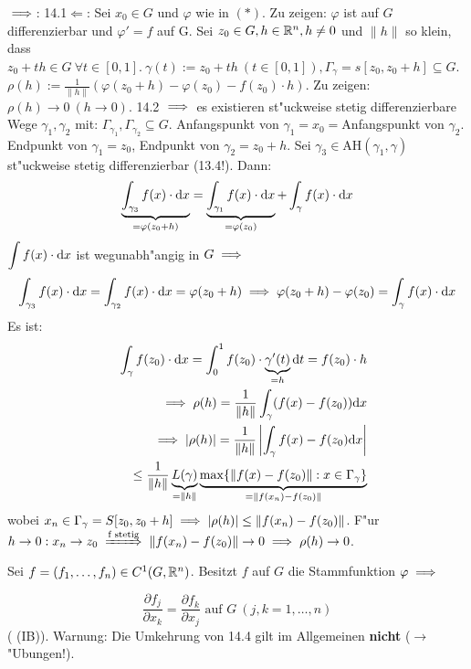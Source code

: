 \documentclass[a4paper,twoside,DIV15,BCOR12mm,chapterprefix=true,headings=twolinechapter]{scrbook}
\begin{document}
\begin{beweis}
\glqq$\implies$\grqq: 14.1\quad \glqq$\Leftarrow$\grqq: Sei $x_0\in G$ und $\varphi$ wie in $(*)$. Zu zeigen: $\varphi$ ist auf $G$ differenzierbar und $\varphi'=f$ auf G. Sei $z_0\in G, h\in\mathbb{R}^n,h\ne 0$ und $\|h\|$ so klein, dass $z_0+th\in G\ \forall t\in[0,1].\ \gamma(t):=z_0+th\ (t\in[0,1]), \Gamma_\gamma=s[z_0, z_0+h]\subseteq G$. $\rho(h):=\frac{1}{\|h\|}(\varphi(z_0+h)-\varphi(z_0)-f(z_0)\cdot h)$. Zu zeigen: $\rho(h)\to 0\ (h\to 0)$. 14.2 $\implies$ es existieren st"uckweise stetig differenzierbare Wege $\gamma_1, \gamma_2$ mit: $\Gamma_{\gamma_1},\Gamma_{\gamma_2}\subseteq G$. Anfangspunkt von $\gamma_1=x_0=$Anfangspunkt von $\gamma_2$. Endpunkt von $\gamma_1=z_0$, Endpunkt von $\gamma_2=z_0+h$. Sei $\gamma_3\in \text{AH}(\gamma_1,\gamma)$ st"uckweise stetig differenzierbar (13.4!). Dann: 
$$\underbrace{\displaystyle\int_{\gamma_3}f(x)\cdot\text{d}x}_{=\varphi(z_0+h)}=\underbrace{\displaystyle\int_{\gamma_1}f(x)\cdot\text{d}x}_{=\varphi(z_0)}+\displaystyle\int_{\gamma}f(x)\cdot\text{d}x$$
$\displaystyle\int f(x)\cdot\text{d}x$ ist wegunabh"angig in $G\implies$\\
$$\displaystyle\int_{\gamma_3}f(x)\cdot\text{d}x=\displaystyle\int_{\gamma_2}f(x)\cdot\text{d}x=\varphi(z_0+h)\implies\varphi(z_0+h)-\varphi(z_0)=\displaystyle\int_{\gamma}f(x)\cdot\text{d}x$$
Es ist:
\begin{eqnarray*}
&&\displaystyle\int_{\gamma}f(z_0)\cdot\text{d}x=\displaystyle\int_0^1 f(z_0)\cdot\underbrace{\gamma'(t)}_{=h}\text{d}t=f(z_0)\cdot h\\
&&\implies \rho(h)=\frac{1}{\|h\|}\displaystyle\int_{\gamma}(f(x)-f(z_0))\text{d}x\\
&&\implies |\rho(h)|=\frac{1}{\|h\|}\left|\displaystyle\int_{\gamma}f(x)-f(z_0)\text{d}x\right|\\
&&\le\frac{1}{\|h\|}\underbrace{L(\gamma)}_{=\|h\|}\underbrace{\max\{\|f(x)-f(z_0)\|: x\in\Gamma_\gamma\}}_{=\|f(x_n)-f(z_0)\|}
\end{eqnarray*}
wobei $x_n\in\Gamma_\gamma=S[z_0,z_0+h]\implies |\rho(h)|\le\|f(x_n)-f(z_0)\|$. F"ur $h\to 0: x_n\to z_0\folgtnach{f stetig}\|f(x_n)-f(z_0)\|\to 0\folgt\rho(h)\to 0$.
\end{beweis}

\begin{satz}[Integrabilitätsbedingungen]
Sei $f=(f_1,\ldots, f_n)\in C^1(G,\mathbb{R}^n)$. Besitzt $f$ auf $G$ die Stammfunktion $\varphi\implies$

$$\frac{\partial f_j}{\partial x_k}=\frac{\partial f_k}{\partial x_j}\text{ auf }G\ (j,k=1,\ldots,n)$$
( (IB)). Warnung: Die Umkehrung von 14.4 gilt im Allgemeinen \textbf{nicht} ($\to$ "Ubungen!).
\end{satz}
\end{document}
